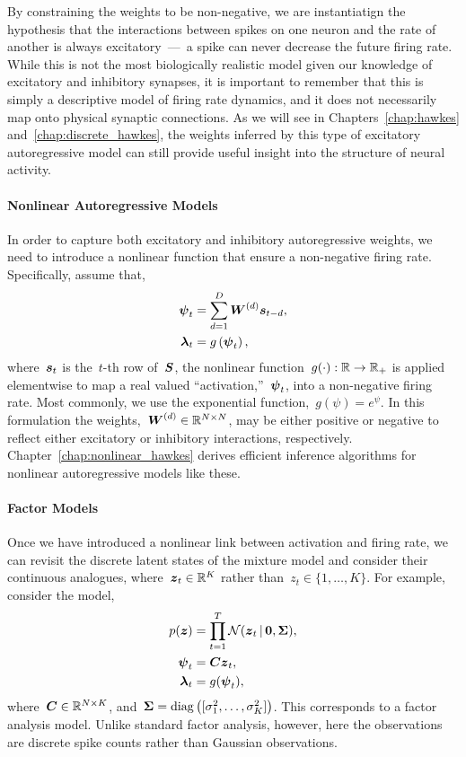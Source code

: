 By constraining the weights to be non-negative, we are instantiatign
the hypothesis that the interactions between spikes on one neuron and
the rate of another is always excitatory~---~a spike can never
decrease the future firing rate. While this is not the most
biologically realistic model given our knowledge of excitatory and
inhibitory synapses, it is important to remember that this is simply a
descriptive model of firing rate dynamics, and it does not necessarily
map onto physical synaptic connections. As we will see in
Chapters~\ref{chap:hawkes} and~\ref{chap:discrete_hawkes}, the weights
inferred by this type of excitatory autoregressive model can still
provide useful insight into the structure of neural activity.

\paragraph{Nonlinear Autoregressive Models}
In order to capture both excitatory and inhibitory autoregressive weights,
we need to introduce a nonlinear function that ensure a non-negative firing 
rate. Specifically, assume that,
\begin{align}
  \boldsymbol{\psi}_t &= \sum_{d=1}^D \boldsymbol{W}^{(d)} \boldsymbol{s}_{t-d}, \\
  \boldsymbol{\lambda}_t &= g \left( \boldsymbol{\psi}_t \right),
\end{align}
where~$\boldsymbol{s}_{t}$ is the~$t$-th row of~$\boldsymbol{S}$, the nonlinear
function~${g(\cdot): \mathbb{R} \to \mathbb{R}_+}$ is applied elementwise to
map a real valued ``activation,''~$\boldsymbol{\psi}_t$, into a non-negative
firing rate. Most commonly, we use the exponential
function,~$g(\psi) = e^\psi$. In this formulation the
weights,~${\boldsymbol{W}^{(d)} \in \mathbb{R}^{N \times N}}$, may be either positive
or negative to reflect either excitatory or inhibitory interactions,
respectively. Chapter~\ref{chap:nonlinear_hawkes} derives efficient
inference algorithms for nonlinear autoregressive models like these.

\paragraph{Factor Models}
Once we have introduced a nonlinear link between activation and firing
rate, we can revisit the discrete latent states of the mixture model
and consider their continuous analogues, where~$\boldsymbol{z}_t \in \mathbb{R}^K$
rather than~$z_t \in \{1, \ldots, K\}$. For example, consider the
model,
\begin{align}
  p(\boldsymbol{z}) &= \prod_{t=1}^T \mathcal{N}(\boldsymbol{z}_t \,|\, \boldsymbol{0}, \boldsymbol{\Sigma}), \\
  \boldsymbol{\psi}_t &= \boldsymbol{C} \boldsymbol{z}_t, \\
  \boldsymbol{\lambda}_t &= g(\boldsymbol{\psi}_t),
\end{align}
where~$\boldsymbol{C} \in \mathbb{R}^{N \times
  K}$, and~${\boldsymbol{\Sigma} = \mathrm{diag} \left([ \sigma^2_1, \ldots, \sigma^2_K ] \right)}$.
This corresponds to a factor analysis model. Unlike standard 
factor analysis, however, here the observations are discrete spike 
counts rather than Gaussian observations. 

